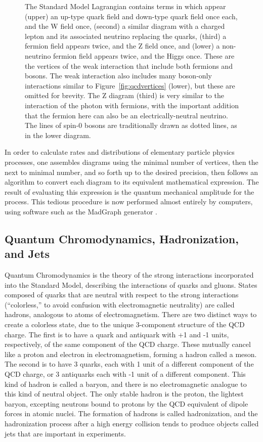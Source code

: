 \begin{figure}[h!]
    \caption[Some vertices of the weak interaction.]{
      The Standard Model Lagrangian contains terms in which appear (upper) an up-type quark field and down-type quark field once each, and the W field once, (second) a similar diagram with a charged lepton and its associated neutrino replacing the quarks, (third) a fermion field appears twice, and the Z field once, and (lower) a non-neutrino fermion field appears twice, and the Higgs once.
      These are the vertices of the weak interaction that include both fermions and bosons.      
      The weak interaction also includes many boson-only interactions similar to Figure~\ref{fig:qcdvertices} (lower), but these are omitted for brevity.
      The Z diagram (third) is very similar to the interaction of the photon with fermions, with the important addition that the fermion here can also be an electrically-neutral neutrino.
      The lines of spin-0 bosons are traditionally drawn as dotted lines, as in the lower diagram.
    }
    \label{fig:weakvertices}
  \end{figure}  

  In order to calculate rates and distributions of elementary particle physics processes, one assembles diagrams using the minimal number of vertices, then the next to minimal number, and so forth up to the desired precision, then follows an algorithm to convert each diagram to its equivalent mathematical expression.
  The result of evaluating this expression is the quantum mechanical amplitude for the process.
  This tedious procedure is now performed almost entirely by computers, using software such as the MadGraph generator \cite{madgraph}.

  \subsection{Quantum Chromodynamics, Hadronization, and Jets} \label{sec:hadronization}

  Quantum Chromodynamics is the theory of the strong interactions incorporated into the Standard Model, describing the interactions of quarks and gluons.
  States composed of quarks that are neutral with respect to the strong interactions (``colorless,'' to avoid confusion with electromagnetic neutrality) are called hadrons, analogous to atoms of electromagnetism.
  There are two distinct ways to create a colorless state, due to the unique 3-component structure of the QCD charge.
  The first is to have a quark and antiquark with +1 and -1 units, respectively, of the same component of the QCD charge.
  These mutually cancel like a proton and electron in electromagnetism, forming a hadron called a meson.
  The second is to have 3 quarks, each with 1 unit of a different component of the QCD charge, or 3 antiquarks each with -1 unit of a different component.
  This kind of hadron is called a baryon, and there is no electromagnetic analogue to this kind of neutral object.
  The only stable hadron is the proton, the lightest baryon, excepting neutrons bound to protons by the QCD equivalent of dipole forces in atomic nuclei.
  The formation of hadrons is called hadronization, and the hadronization process after a high energy collision tends to produce objects called jets that are important in experiments.
  
